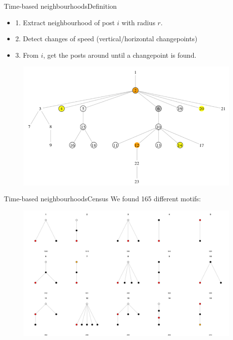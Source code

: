 \documentclass{beamer}
\begin{document}
\begin{frame}{Time-based neighbourhoods}{Definition}
\begin{itemize}
	\item 1. Extract neighbourhood of post $i$ with radius $r$.
	\item 2. Detect changes of speed (vertical/horizontal changepoints)
	\item 3. From $i$, get the posts around until a changepoint is found.
\end{itemize}
	\begin{figure}
		\centering
		\includegraphics[width=1\textwidth]{breakpoints2}
	\end{figure}
\end{frame}


\begin{frame}{Time-based neighbourhoods}{Census}
We found 165 different motifs:
	\begin{figure}
		\centering
		\includegraphics[width=1\textwidth]{neighbourhoods_time_1}
	\end{figure}
\end{frame}
\end{document}
